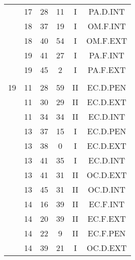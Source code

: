 \documentclass[12pt, a4paper]{article}
\begin{document}
\begin{multicols}{3}
{\begin{tabular}{c c c c c c}
	 	 	 	 & 17 & 28 & 11 & I & PA.D.INT\\%
	 	 	 	 & 18 & 37 & 19 & I & OM.F.INT\\%
	 	 	 	 & 18 & 40 & 54 & I & OM.F.EXT\\%
	 	 	 	 & 19 & 41 & 27 & I & PA.F.INT\\%
	 	 	 	 & 19 & 45 & 2 & I & PA.F.EXT\\%
	 	 	 	 & & & & & \\%
	 	 	 	19 & 11 & 28 & 59 & II & EC.D.PEN\\%
	 	 	 	 & 11 & 30 & 29 & II & EC.D.EXT\\%
	 	 	 	 & 11 & 34 & 34 & II & EC.D.INT\\%
	 	 	 	 & 13 & 37 & 15 & I & EC.D.PEN\\%
	 	 	 	 & 13 & 38 & 0 & I & EC.D.EXT\\%
	 	 	 	 & 13 & 41 & 35 & I & EC.D.INT\\%
	 	 	 	 & 13 & 41 & 31 & II & OC.D.EXT\\%
	 	 	 	 & 13 & 45 & 31 & II & OC.D.INT\\%
	 	 	 	 & 14 & 16 & 39 & II & EC.F.INT\\%
	 	 	 	 & 14 & 20 & 39 & II & EC.F.EXT\\%
	 	 	 	 & 14 & 22 & 9 & II & EC.F.PEN\\%
	 	 	 	 & 14 & 39 & 21 & I & OC.D.EXT\\%
	 	 \end{tabular}
 	}
\end{multicols}
\end{document}
